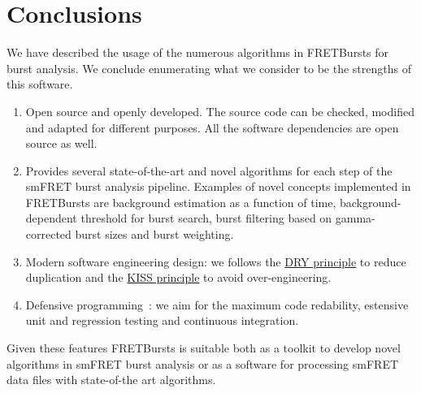 \section{Conclusions}
\label{sec:conclusions}

We have described the usage of the numerous algorithms in FRETBursts
for burst analysis. We conclude enumerating what we consider to be the strengths
of this software.

\begin{enumerate}
\item Open source and openly developed. The source code can be checked, modified and
adapted for different purposes. All the software dependencies are open source as well.
\item Provides several state-of-the-art and novel algorithms for each step of the 
smFRET burst analysis pipeline. Examples of novel concepts implemented in FRETBursts are background estimation as a function of time,
background-dependent threshold for burst search, burst filtering based on 
gamma-corrected burst sizes and burst weighting.
\item Modern software engineering design: we follows the \href{http://en.wikipedia.org/wiki/Don\%27t_repeat_yourself}{DRY principle} to reduce duplication and the \href{http://en.wikipedia.org/wiki/KISS_principle}{KISS principle} to avoid over-engineering.
\item Defensive programming~\cite{Prli__2012}: we aim for the maximum code redability,
estensive unit and regression testing and continuous integration.
\end{enumerate}

Given these features FRETBursts is suitable both as a toolkit to develop novel algorithms
in smFRET burst analysis or as a software for processing smFRET data files with
state-of-the art algorithms.

